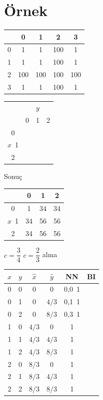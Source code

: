 \documentclass[11pt,a4paper]{article}
\begin{document}
\section{Örnek}
\noindent
\begin{minipage}[t]{0.48\linewidth}
\begin{tabular}{c|cccc}
 & 0 & 1 & 2 & 3 \\ \hline
0 & 1 & 1 & 100 & 1 \\
1 & 1 & 1 & 100 & 1 \\
2 & 100 & 100 & 100 & 100 \\
3 & 1 & 1 & 100 & 1
\end{tabular}

\bigskip
\begin{tabular}{c|ccc}
 & \multicolumn{3}{c}{$y$} \\
 & 0 & 1 & 2 \\ \hline
0 & & & \\
$x$\ 1 & & & \\
2 & & &
\end{tabular}
\end{minipage}\hfill
\begin{minipage}[t]{0.48\linewidth}
Sonuç

\begin{tabular}{c|ccc}
 & 0 & 1 & 2 \\ \hline
0 & 1 & 34 & 34 \\
$x$\ 1 & 34 & 56 & 56 \\
2 & 34 & 56 & 56
\end{tabular}
\end{minipage}

\medskip
$c=\dfrac{3}{4}$ \qquad $c=\dfrac{2}{3}$ alma

\medskip
\begin{center}
\begin{tabular}{cc|cc|c|c}
$x$ & $y$ & $\hat{x}$ & $\hat{y}$ & NN & BI \\ \hline
0 & 0 & 0 & 0 & {\scriptsize 0,0}\ 1 & \\
0 & 1 & 0 & $4/3$ & {\scriptsize 0,1}\ 1 & \\
0 & 2 & 0 & $8/3$ & {\scriptsize 0,3}\ 1 & \\
1 & 0 & $4/3$ & 0 & 1 & \\
1 & 1 & $4/3$ & $4/3$ & 1 & \\
1 & 2 & $4/3$ & $8/3$ & 1 & \\
2 & 0 & $8/3$ & 0 & 1 & \\
2 & 1 & $8/3$ & $4/3$ & 1 & \\
2 & 2 & $8/3$ & $8/3$ & 1 & \\
\end{tabular}
\end{center}
\end{document}
